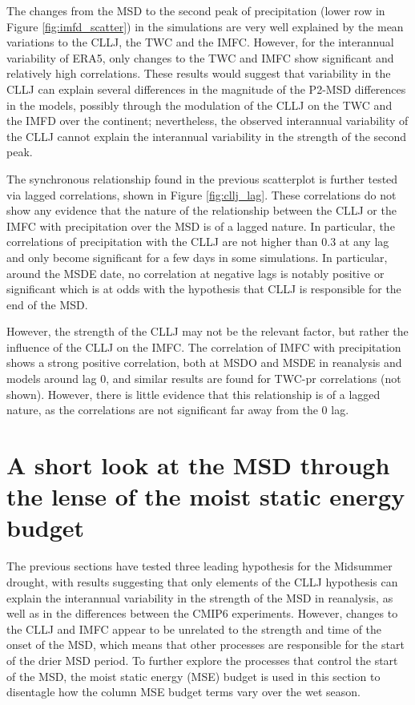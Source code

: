 The changes from the MSD to the second peak of precipitation (lower row in Figure \ref{fig:imfd_scatter}) in the simulations are very well explained by the mean variations to the CLLJ, the TWC and the IMFC. However, for the interannual variability of ERA5, only changes to the TWC and IMFC show significant and relatively high correlations. These results would suggest that variability in the CLLJ can explain several differences in the magnitude of the P2-MSD differences in the models, possibly through the modulation of the CLLJ on the TWC and the IMFD over the continent; nevertheless, the observed interannual variability of the CLLJ cannot explain the interannual variability in the strength of the second peak. %

The synchronous relationship found in the previous scatterplot is further tested via lagged correlations, shown in Figure \ref{fig:cllj_lag}. These correlations do not show any evidence that the nature of the relationship between the CLLJ or the IMFC with precipitation over the MSD is of a lagged nature. In particular, the correlations of precipitation with the CLLJ are not higher than 0.3 at any lag and only become significant for a few days in some simulations. In particular, around the MSDE date, no correlation at negative lags is notably positive or significant which is at odds with the hypothesis that CLLJ is responsible for the end of the MSD. 

However, the strength of the CLLJ may not be the relevant factor, but rather the influence of the CLLJ on the IMFC. The correlation of IMFC with precipitation shows a strong positive correlation, both at MSDO and MSDE in reanalysis and models around lag 0, and similar results are found for TWC-pr correlations (not shown). However, there is little evidence that this relationship is of a lagged nature, as the correlations are not significant far away from the 0 lag. 



\section{A short look at the MSD through the lense of the moist static energy budget}

The previous sections have tested three leading hypothesis for the Midsummer drought, with results suggesting that only elements of the CLLJ hypothesis can explain the interannual variability in the strength of the MSD in reanalysis, as well as in the differences between the CMIP6 experiments. However, changes to the CLLJ and IMFC appear to be unrelated to the strength and time of the onset of the MSD, which means that other processes are responsible for the start of the drier MSD period. 
To further explore the processes that control the start of the MSD, the moist static energy (MSE) budget is used in this section to disentagle how the column MSE budget terms vary over the wet season.

